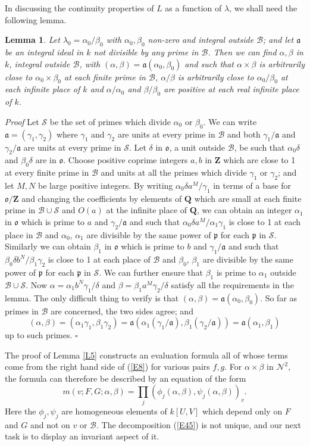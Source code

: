 \documentclass[12pt]{article}
\def\bQ{{\mathbf Q}}
\def\bZ{{\mathbf Z}}
\def\fa{{\mathfrak a}}
\def\fo{{\mathfrak o}}
\def\fp{{\mathfrak p}}
\def\ga{{\alpha}}
\def\gb{{\beta}}
\def\gg{{\gamma}}
\def\gd{{\delta}}
\def\gl{{\lambda}}
\def\sB{{\mathcal B}}
\def\sN{{\mathcal N}}
\def\sS{{\mathcal S}}
\def\qed{{\hfill$\square$}}
\def\beq{\begin{equation} \label}
\def\ble{\begin{lemma} \label}
\def\ele{\end{lemma}}
\newtheorem{lemma}{Lemma}
\begin{document}
In discussing the continuity properties of $L$ as a function of $\gl$, we shall
need the following lemma.
\ble{L17} Let $\gl_0=\ga_0/\gb_0$ with $\ga_0,\gb_0$ non-zero and integral
outside	$\sB$; and let $\fa$ be an integral ideal in $k$ not divisible by
any prime in $\sB$. Then we can find $\ga,\gb$ in $k$, integral outside
$\sB$, with $(\ga,\gb)=\fa(\ga_0,\gb_0)$ and such that
$\ga\times\gb$ is arbitrarily close to $\ga_0\times\gb_0$ at each finite prime
in $\sB$, $\ga/\gb$ is arbitrarily close to $\ga_0/\gb_0$ at each infinite
place of $k$ and $\ga/\ga_0$ and $\gb/\gb_0$ are positive at each real infinite
place of $k$.
\ele
\emph{Proof} Let $\sS$ be the set of primes which divide $\ga_0$ or $\gb_0$.
We can write $\fa=(\gg_1,\gg_2)$ where $\gg_1$ and $\gg_2$ are units at every
prime in $\sB$ and both $\gg_1/\fa$ and $\gg_2/\fa$ are units at every prime in
$\sS$. Let $\gd$ in $\fo$, a
unit outside $\sB$, be such that $\ga_0\gd$ and $\gb_0\gd$ are in
$\fo$. Choose
positive coprime integers $a,b$ in $\bZ$ which are close to 1 at every finite
prime in $\sB$ and units at all the primes which divide $\gg_1$ or $\gg_2$;
and let $M,N$ be large positive integers. By writing $\ga_0\gd a^M/\gg_1$ in terms
of a base for $\fo/\bZ$ and changing the coefficients by elements of $\bQ$ which
are small at each finite prime in $\sB\cup\sS$ and $O(a)$ at the infinite place
of $\bQ$, we can obtain an integer $\ga_1$ in $\fo$ which is prime to $a$
and $\gg_2/\fa$ and such that $\ga_0\gd a^M/\ga_1\gg_1$ is close to 1
at each place in $\sB$ and $\ga_0$, $\ga_1$ are divisible by the same power
of $\fp$ for each $\fp$ in $\sS$. Similarly we can obtain $\gb_1$ in
$\fo$ which is prime to $b$ and $\gg_1/\fa$ and such that
$\gb_0\gd b^N/\gb_1\gg_2$ is close to 1 at each place of $\sB$ and $\gb_0$,
$\gb_1$ are divisible by the same power of $\fp$ for each $\fp$ in $\sS$.
We can further ensure that $\gb_1$ is
prime to $\ga_1$ outside $\sB\cup\sS$. Now $\ga=\ga_1 b^N\gg_1/\gd$ and
$\gb=\gb_1 a^M\gg_2/\gd$ satisfy all the requirements in the lemma. The
only difficult thing to verify is that $(\ga,\gb)=\fa(\ga_0,\gb_0)$. So far
as primes in $\sB$ are concerned, the two sides agree; and
\[ (\ga,\gb)=(\ga_1\gg_1,\gb_1\gg_2)=\fa(\ga_1(\gg_1/\fa),\gb_1(\gg_2
/\fa))=\fa(\ga_1,\gb_1) \]
up to such primes.  \qed

The proof of Lemma \ref{L5} constructs an evaluation formula all of whose terms
come from the right hand side of (\ref{E8}) for various pairs $f,g$. For
$\ga\times\gb$ in $\sN^2$, the
formula can therefore be described by an equation of the form
\beq{E45} m(v;F,G;\ga,\gb)=\prod_j(\phi_j(\ga,\gb),\psi_j(\ga,\gb))_v.
\end{equation}
Here the $\phi_j,\psi_j$ are homogeneous elements of $k[U,V]$ which depend
only on $F$ and $G$ and not on $v$ or $\sB$. The
decomposition (\ref{E45}) is not unique, and our next task is
to display an invariant aspect of it.
\end{document}
